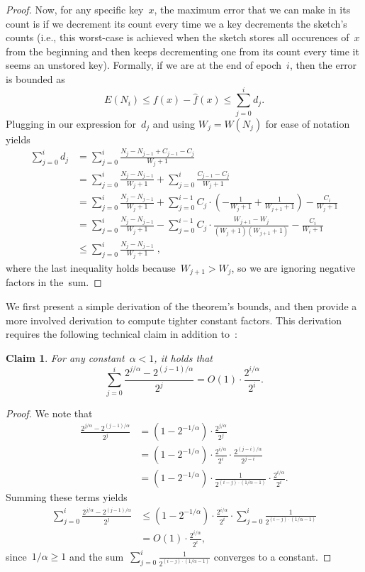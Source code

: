 \documentclass[sigconf]{acmart}
\newtheorem{claim}[theorem]{Claim}
\newcommand{\parentheses}[1]{\left(#1\right)}
\begin{document}
\begin{proof}
    Now, for any specific key~$x$, the maximum error that we can make in its
    count is if we decrement its count every time we a key decrements the
    sketch's counts (i.e., this worst-case is achieved when the sketch stores
    all occurences of~$x$ from the beginning and then keeps decrementing one
    from its count every time it seems an unstored key). Formally, if we are at
    the end of epoch~$i$, then the error is bounded as
    $$ E(N_i) \leq f(x) - \hat{f}(x) \leq \sum_{j=0}^i d_j.$$
    \noindent
    Plugging in our expression for~$d_j$ and using $W_j=W(N_j)$ for ease of
    notation yields 
    \begin{align*}
        \sum_{j=0}^i d_j & = \sum_{j=0}^i  \frac{N_j - N_{j-1} + C_{j-1}-C_j}{W_j+1} \\
        &= \sum_{j=0}^i \frac{N_j - N_{j-1}}{W_j+1} + \sum_{j=0}^i \frac{C_{j-1}-C_j}{W_j+1} \\
        &=\sum_{j=0}^i \frac{N_j - N_{j-1}}{W_j+1} + \sum_{j=0}^{i-1} C_j \cdot \parentheses{-\frac{1}{W_j+1}+\frac{1}{W_{j+1}+1}} - \frac{C_i}{W_j+1}\\
        &=\sum_{j=0}^i \frac{N_j - N_{j-1}}{W_j+1} - \sum_{j=0}^{i-1} C_j \cdot \frac{W_{j+1} - W_j}{(W_j+1)(W_{j+1}+1)} - \frac{C_i}{W_i+1}\\
        &\leq \sum_{j=0}^i  \frac{N_j - N_{j-1}}{W_j+1}  \;,
    \end{align*}
    where the last inequality holds because~$W_{j+1}>W_j$, so we are ignoring negative factors in the~sum.
\end{proof}

We first present a simple derivation of the theorem's bounds, and then provide a more involved derivation to compute tighter constant factors.
This derivation requires the following technical claim in addition to~:
\begin{claim}
    \label{claim:technical}
    For any constant~$\alpha<1$, it holds that 
    $$ \sum_{j=0}^i \frac{2^{j/\alpha} - 2^{(j-1)/\alpha}}{2^{j}} = O(1) \cdot \frac{2^{i/\alpha}}{2^i}. $$
\end{claim}
\begin{proof} 
    We note that
    \begin{align*}
        \frac{2^{j/\alpha} - 2^{(j-1)/\alpha} } {2^j} &= (1-2^{-1/\alpha}) \cdot \frac{2^{j/\alpha} } {2^j} \\
        & = (1-2^{-1/\alpha}) \cdot  \frac{2^{i/\alpha}}{2^i } \cdot \frac{2^{(j-i)/\alpha}}{2^{j-i}} \\
        & =  (1-2^{-1/\alpha}) \cdot \frac{1}{2^{(i-j)\cdot (1/\alpha-1)}} \cdot \frac{2^{i/\alpha}}{2^i }.
    \end{align*}
    Summing these terms yields
    \begin{align*}
        \sum_{j=0}^i \frac{2^{j/\alpha} - 2^{(j-1)/\alpha} } {2^j} & \leq (1-2^{-1/\alpha}) \cdot \frac{2^{i/\alpha}}{2^i} \cdot \sum_{j=0}^i \frac{1}{2^{(i-j)\cdot (1/\alpha-1)}} \\
        &= O(1) \cdot \frac{2^{i/\alpha}}{2^i},
    \end{align*}
    since~$1/\alpha \geq 1$ and the sum~$\sum_{j=0}^i \frac{1}{2^{(i-j) \cdot
    (1/\alpha-1)}}$ converges to a constant.
\end{proof}
\end{document}
